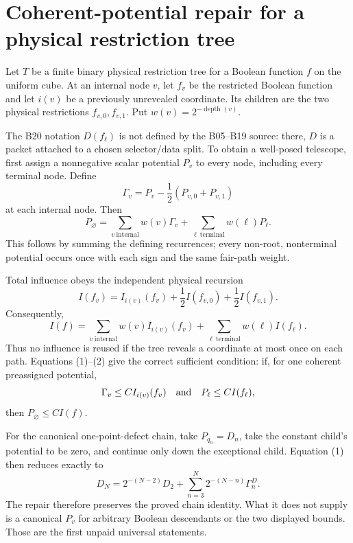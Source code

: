 \section*{Coherent-potential repair for a physical restriction tree}

Let $T$ be a finite binary physical restriction tree for a Boolean function
$f$ on the uniform cube.  At an internal node $v$, let $f_v$ be the
restricted Boolean function and let $i(v)$ be a previously unrevealed
coordinate.  Its children are the two physical restrictions
$f_{v,0},f_{v,1}$.  Put $w(v)=2^{-\operatorname{depth}(v)}$.

The B20 notation $D(f_\ell)$ is not defined by the B05--B19 source: there,
$D$ is a packet attached to a chosen selector/data split.  To obtain a
well-posed telescope, first assign a nonnegative scalar potential $P_v$ to
every node, including every terminal node.  Define
\[
  \Gamma_v=P_v-\frac12(P_{v,0}+P_{v,1})
\]
at each internal node.  Then
\[
 \boxed{
 P_{\varnothing}
 =\sum_{v\ \mathrm{internal}}w(v)\Gamma_v
 +\sum_{\ell\ \mathrm{terminal}}w(\ell)P_\ell .}
\tag{1}
\]
This follows by summing the defining recurrences; every non-root,
nonterminal potential occurs once with each sign and the same fair-path
weight.

Total influence obeys the independent physical recursion
\[
 I(f_v)=I_{i(v)}(f_v)+\frac12 I(f_{v,0})+
                         \frac12 I(f_{v,1}).
\]
Consequently,
\[
 \boxed{
 I(f)=\sum_{v\ \mathrm{internal}}w(v)I_{i(v)}(f_v)
 +\sum_{\ell\ \mathrm{terminal}}w(\ell)I(f_\ell).}
\tag{2}
\]
Thus no influence is reused if the tree reveals a coordinate at most once
on each path.  Equations (1)--(2) give the correct sufficient condition:
if, for one coherent preassigned potential,
\[
 \Gamma_v\le C I_{i(v)}(f_v)
 \quad\hbox{and}\quad
 P_\ell\le C I(f_\ell),
\]
then $P_{\varnothing}\le C I(f)$.

For the canonical one-point-defect chain, take $P_{q_n}=D_n$, take the
constant child's potential to be zero, and continue only down the
exceptional child.  Equation (1) then reduces exactly to
\[
 D_N=2^{-(N-2)}D_2+
 \sum_{n=3}^{N}2^{-(N-n)}\Gamma_n^D.
\]
The repair therefore preserves the proved chain identity.  What it does
not supply is a canonical $P_v$ for arbitrary Boolean descendants or the
two displayed bounds.  Those are the first unpaid universal statements.
